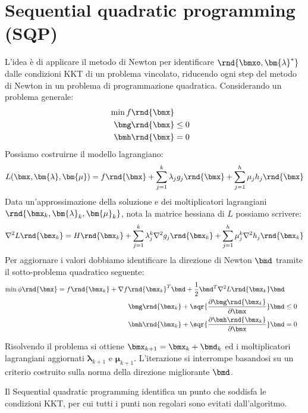 \documentclass[\main/main.tex]{subfiles}
\begin{document}
\section{Sequential quadratic programming (SQP)}
L'idea è di applicare il metodo di Newton per identificare \(\rnd{\bmxo, \bm{\lambda}^*}\) dalle condizioni KKT di un problema vincolato, riducendo ogni step del metodo di Newton in un problema di programmazione quadratica. Considerando un problema generale:
\begin{align*}
    \min f\rnd{\bmx}\\
    \bmg\rnd{\bmx} &\leq 0\\
    \bmh\rnd{\bmx} &= 0\\
\end{align*}
Possiamo costruirne il modello lagrangiano:
\[
    L(\bmx, \bm{\lambda}, \bm{\mu}) = f\rnd{\bmx} + \sum_{j=1}^k \lambda_j g_j\rnd{\bmx} + \sum_{j=1}^h \mu_j h_j\rnd{\bmx}
\]Data un'approssimazione della soluzione e dei moltiplicatori lagrangiani \(\rnd{\bmx_k, \bm{\lambda}_k, \bm{\mu}_k}\), nota la matrice hessiana di \(L\) possiamo scrivere:
\[
    \nabla^2 L\rnd{\bmx_k} = H\rnd{\bmx_k} + \sum_{j=1}^k \lambda_j^k \nabla^2g_j\rnd{\bmx_k} + \sum_{j=1}^h \mu_j^k \nabla^2h_j\rnd{\bmx_k}
\]Per aggiornare i valori dobbiamo identificare la direzione di Newton \(\bmd \) tramite il sotto-problema quadratico seguente:\begin{align*}
    \min \phi\rnd{\bmx} = f\rnd{\bmx_k} + \nabla {f\rnd{\bmx_k}}^T \bmd+ \frac{1}{2}\bmd^T\nabla^2L\rnd{\bmx_k}\bmd \\
    \bmg\rnd{\bmx_k} + \sqr{\frac{\partial \bmg\rnd{\bmx_k}}{\partial \bmx}}\bmd &\leq 0\\
    \bmh\rnd{\bmx_k} + \sqr{\frac{\partial \bmh\rnd{\bmx_k}}{\partial \bmx}}\bmd &= 0\\
\end{align*}

Risolvendo il problema si ottiene \(\bmx_{k+1} = \bmx_k + \bmd_k\) ed i moltiplicatori lagrangiani aggiornati \(\bm{\lambda}_{k+1}\) e \(\bm{\mu}_{k+1}\). L'iterazione si interrompe basandosi su un criterio costruito sulla norma della direzione migliorante \(\bmd \).

Il Sequential quadratic programming identifica un punto che soddisfa le condizioni KKT, per cui tutti i punti non regolari sono evitati dall'algoritmo.
\end{document}

